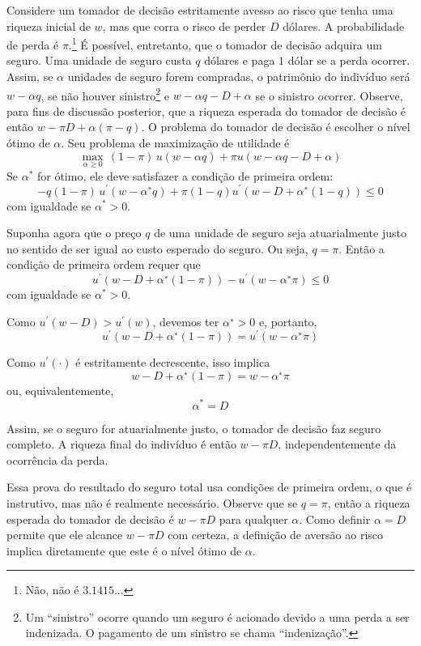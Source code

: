 \documentclass[12pt]{article}
\numberwithin{equation}{section}
\theoremstyle{plain}
\theoremstyle{definition}
\theoremstyle{remark}
\begin{document}
Considere um tomador de decisão estritamente avesso ao risco que tenha uma riqueza inicial de \(w\), mas que corra o risco de perder \(D\) dólares. A probabilidade de perda é \(\pi\).\footnote{Não, não é \(3.1415 \dots\)} É possível, entretanto, que o tomador de decisão adquira um seguro. Uma unidade de seguro custa \(q\) dólares e paga \(1\) dólar se a perda ocorrer. Assim, se \(\alpha\) unidades de seguro forem compradas, o patrimônio do indivíduo será \(w-\alpha q\), se não houver sinistro\footnote{Um ``sinistro'' ocorre quando um seguro é acionado devido a uma perda a ser indenizada. O pagamento de um sinistro se chama ``indenização''.} e \(w-\alpha q-D+\alpha\) se o sinistro ocorrer. Observe, para fins de discussão posterior, que a riqueza esperada do tomador de decisão é então \(w - \pi D + \alpha (\pi - q)\). O problema do tomador de decisão é escolher o nível ótimo de \(\alpha\). Seu problema de maximização de utilidade é
\[
\max\limits_{\alpha \geq 0}  \,(1-\pi) \, u(w-\alpha q) + \pi u(w-\alpha q - D + \alpha )
\]
Se \(\alpha^*\) for ótimo, ele deve satisfazer a condição de primeira ordem:
\[
-q(1-\pi) \, u^{\prime} (w-\alpha^∗ q)+ \pi(1-q) u^{\prime} (w-D+\alpha^∗ (1-q)) \leq 0
\]
com igualdade se \(\alpha^* > 0\).

Suponha agora que o preço \(q\) de uma unidade de seguro seja atuarialmente justo no sentido de ser igual ao custo esperado do seguro. Ou seja, \(q=\pi\). Então a condição de primeira ordem requer que
\[
u^{\prime} (w-D+\alpha^∗ (1-\pi))-u^{\prime} (w-\alpha^∗ \pi) \leq 0
\]
com igualdade se \(\alpha^* > 0\).

Como \(u^\prime (w-D) > u^′ (w)\), devemos ter \(\alpha^∗>0\) e, portanto,
\[
u^′ (w-D+\alpha^∗ (1-\pi))=u^′ (w-\alpha^∗ \pi)
\]

Como \(u^′ (\cdot)\) é estritamente decrescente, isso implica
\[
w-D+\alpha^∗ (1-\pi)=w-\alpha^∗ \pi
\]
ou, equivalentemente,
\[
\alpha^* = D
\]

Assim, se o seguro for atuarialmente justo, o tomador de decisão faz seguro completo. A riqueza final do indivíduo é então \(w-\pi D\), independentemente da ocorrência da perda.

Essa prova do resultado do seguro total usa condições de primeira ordem, o que é instrutivo, mas não é realmente necessário. Observe que se \(q=\pi\), então a riqueza esperada do tomador de decisão é \(w-\pi D\) para qualquer \(\alpha\). Como definir \(\alpha=D\) permite que ele alcance \(w-\pi D\) com certeza, a definição de aversão ao risco implica diretamente que este é o nível ótimo de \(\alpha\).
\end{document}
